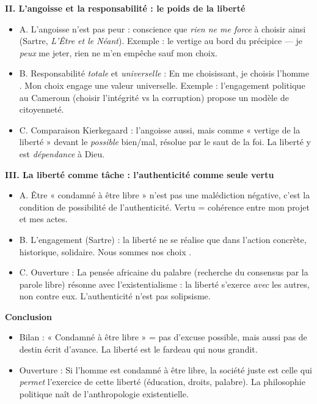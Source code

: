 \documentclass[11pt]{article}
\newcommand{\cle}[1]{{\popxbold\color{popdark}#1}}
\begin{document}
\begin{exoresolu}
\textbf{II. L'angoisse et la responsabilité : le poids de la liberté}
\begin{itemize}
\item A. L'angoisse n'est pas peur : conscience que \emph{rien ne me force} à choisir ainsi (Sartre, \emph{L'Être et le Néant}). Exemple : le vertige au bord du précipice — je \emph{peux} me jeter, rien ne m'en empêche sauf mon choix.
\item B. Responsabilité \emph{totale} et \emph{universelle} : \guillemotleft En me choisissant, je choisis l'homme \guillemotright. Mon choix engage une valeur universelle. Exemple : l'engagement politique au Cameroun (choisir l'intégrité vs la corruption) propose un modèle de citoyenneté.
\item C. Comparaison Kierkegaard : l'angoisse aussi, mais comme « vertige de la liberté » devant le \emph{possible} bien/mal, résolue par le saut de la foi. La liberté y est \emph{dépendance} à Dieu.
\end{itemize}

\textbf{III. La liberté comme tâche : l'authenticité comme seule vertu}
\begin{itemize}
\item A. Être « condamné à être libre » n'est pas une malédiction négative, c'est la \cle{condition de possibilité} de l'authenticité. Vertu = cohérence entre mon projet et mes actes.
\item B. L'engagement (Sartre) : la liberté ne se réalise que dans l'action concrète, historique, solidaire. \guillemotleft Nous sommes nos choix \guillemotright.
\item C. Ouverture : La pensée africaine du \cle{palabre} (recherche du consensus par la parole libre) résonne avec l'existentialisme : la liberté s'exerce \emph{avec} les autres, non contre eux. L'authenticité n'est pas solipsisme.
\end{itemize}

\textbf{Conclusion}
\begin{itemize}
\item Bilan : « Condamné à être libre » = pas d'excuse possible, mais aussi pas de destin écrit d'avance. La liberté est le fardeau qui nous grandit.
\item Ouverture : Si l'homme est condamné à être libre, la société juste est celle qui \emph{permet} l'exercice de cette liberté (éducation, droits, palabre). La philosophie politique naît de l'anthropologie existentielle.
\end{itemize}
\end{exoresolu}
\end{document}
